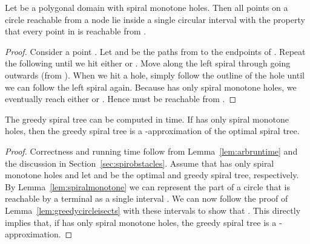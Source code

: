 \documentclass{journalA4}
\begin{document}
\begin{lemma}\label{lem:spiralmonotone}
Let  be a polygonal domain with spiral monotone holes. Then all points on a circle  reachable from a node  lie inside a single circular interval  with the property that every point in  is reachable from .
\end{lemma}
\begin{proof}
Consider a point . Let  and  be the paths from  to the endpoints of . Repeat the following until we hit either  or . Move along the left spiral through  going outwards (from ). When we hit a hole, simply follow the outline of the hole until we can follow the left spiral again. Because  has only spiral monotone holes, we eventually reach either  or . Hence  must be reachable from .
\end{proof}


\begin{theorem}
\label{theo:greedy}
The greedy spiral tree can be computed in  time. If  has only spiral monotone holes, then the greedy spiral tree is a -approximation of the optimal spiral tree.
\end{theorem}
\begin{proof}
Correctness and running time follow from Lemma~\ref{lem:arbruntime} and the discussion in Section~\ref{sec:spirobstacles}.
Assume that  has only spiral monotone holes and let  and  be the optimal and greedy spiral tree, respectively. By Lemma~\ref{lem:spiralmonotone} we can represent the part of a circle  that is reachable by a terminal  as a single interval . We can now follow the proof of Lemma~\ref{lem:greedycircleisects} with these intervals to show that . This directly implies that, if  has only spiral monotone holes, the greedy spiral tree is a -approximation.
\end{proof}
\end{document}
